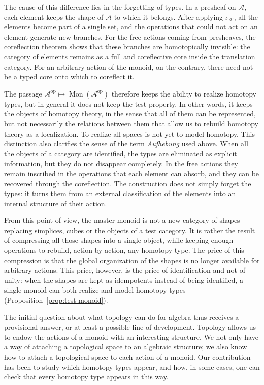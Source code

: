 \documentclass[11pt]{amsart}
\theoremstyle{definition}
\theoremstyle{remark}
\numberwithin{figure}{section}%
\DeclareMathOperator{\Mon}{Mon}
\newcommand{\op}{\mathrm{op}}
\newcommand{\A}{\mathcal{A}}
\begin{document}
The cause of this difference lies in the forgetting of types. In a presheaf on $\A$, each element keeps the shape of $\A$ to which it belongs. After applying $\iota_{\A!}$, all the elements become part of a single set, and the operations that could not act on an element generate new branches. For the free actions coming from presheaves, the coreflection theorem shows that these branches are homotopically invisible: the category of elements remains as a full and coreflective core inside the translation category. For an arbitrary action of the monoid, on the contrary, there need not be a typed core onto which to coreflect it.

The passage $\A^{\op}\mapsto\Mon(\A^{\op})$ therefore keeps the ability to realize homotopy types, but in general it does not keep the test property. In other words, it keeps the objects of homotopy theory, in the sense that all of them can be represented, but not necessarily the relations between them that allow us to rebuild homotopy theory as a localization. To realize all spaces is not yet to model homotopy. This distinction also clarifies the sense of the term \emph{Aufhebung} used above. When all the objects of a category are identified, the types are eliminated as explicit information, but they do not disappear completely. In the free actions they remain inscribed in the operations that each element can absorb, and they can be recovered through the coreflection. The construction does not simply forget the types: it turns them from an external classification of the elements into an internal structure of their action.

From this point of view, the master monoid is not a new category of shapes replacing simplices, cubes or the objects of a test category. It is rather the result of compressing all those shapes into a single object, while keeping enough operations to rebuild, action by action, any homotopy type. The price of this compression is that the global organization of the shapes is no longer available for arbitrary actions. This price, however, is the price of identification and not of unity: when the shapes are kept as idempotents instead of being identified, a single monoid can both realize and model homotopy types (Proposition~\ref{prop:test-monoid}).

The initial question about what topology can do for algebra thus receives a provisional answer, or at least a possible line of development. Topology allows us to endow the actions of a monoid with an interesting structure. We not only have a way of attaching a topological space to an algebraic structure; we also know how to attach a topological space to each action of a monoid. Our contribution has been to study which homotopy types appear, and how, in some cases, one can check that every homotopy type appears in this way.
\end{document}
